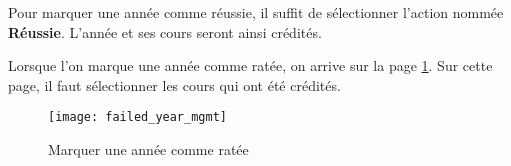 Pour marquer une année comme réussie, il suffit de sélectionner l'action nommée \textbf{Réussie}. L'année et ses cours seront ainsi crédités. 

Lorsque l'on marque une année comme ratée, on arrive sur la page \ref{fig:fail_year}. Sur cette page, il faut sélectionner les cours qui ont été crédités.

\begin{figure}[htb]
\centering
\caption{Marquer une année comme ratée}
\label{fig:fail_year}
\texttt{[image: failed\_year\_mgmt]}

\end{figure}


